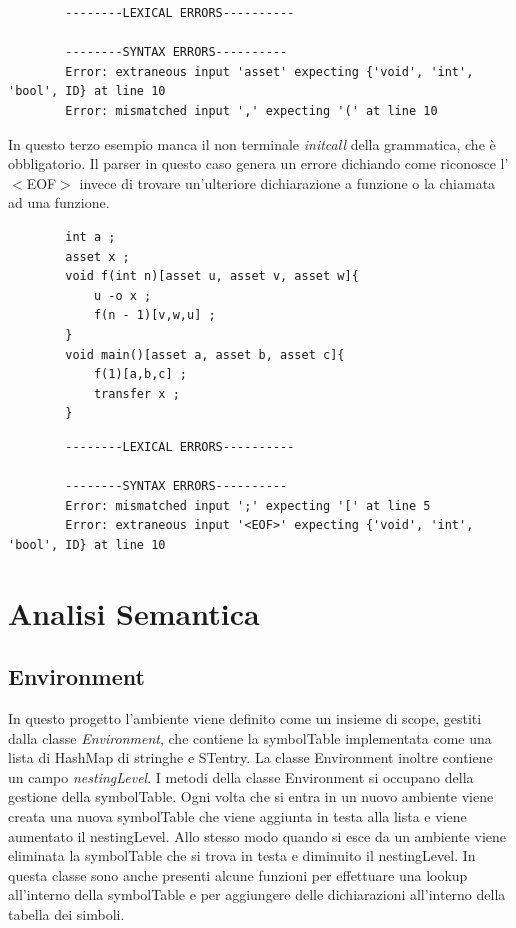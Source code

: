 \documentclass[12pt, a4paper]{report}
\begin{document}
    \begin{lstlisting}
        --------LEXICAL ERRORS----------

        --------SYNTAX ERRORS----------
        Error: extraneous input 'asset' expecting {'void', 'int', 'bool', ID} at line 10
        Error: mismatched input ',' expecting '(' at line 10
       \end{lstlisting}
   In questo terzo esempio manca il non terminale \emph{initcall} della grammatica, che è obbligatorio. Il parser in questo caso genera un errore dichiando come riconosce l'$<$EOF$>$ invece di trovare un'ulteriore dichiarazione a funzione o la chiamata ad una funzione.
    \begin{lstlisting}
        int a ; 
        asset x ;
        void f(int n)[asset u, asset v, asset w]{
            u -o x ;
            f(n - 1)[v,w,u] ;
        }
        void main()[asset a, asset b, asset c]{
            f(1)[a,b,c] ;
            transfer x ;
        }
    \end{lstlisting}
       \begin{lstlisting}
        --------LEXICAL ERRORS----------

        --------SYNTAX ERRORS----------
        Error: mismatched input ';' expecting '[' at line 5
        Error: extraneous input '<EOF>' expecting {'void', 'int', 'bool', ID} at line 10
       \end{lstlisting}    
 \chapter{Analisi Semantica}
 \section{Environment}
 In questo progetto l’ambiente viene definito come un insieme di scope, gestiti dalla classe \emph{Environment}, che contiene la symbolTable implementata come una lista di HashMap di stringhe e STentry. La classe Environment inoltre contiene un campo \emph{nestingLevel}. I metodi della classe Environment si occupano della gestione della symbolTable. Ogni volta che si entra in un nuovo ambiente viene creata una nuova symbolTable che viene aggiunta in testa alla lista e viene aumentato il nestingLevel. Allo stesso modo quando si esce da un ambiente viene eliminata la symbolTable che si trova in testa e diminuito il nestingLevel. In questa classe sono anche presenti alcune funzioni per effettuare una lookup all'interno della symbolTable e per aggiungere delle dichiarazioni all'interno della tabella dei simboli. 
\end{document}
